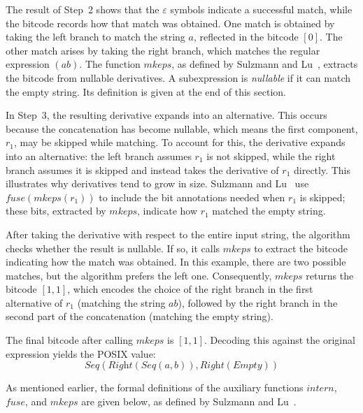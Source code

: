 \documentclass[12pt]{article}
\newcommand{\fuse}{\textit{fuse}}
\newcommand{\mkeps}{\textit{mkeps}}
\newcommand{\intern}{\textit{intern}}
\newcommand{\Seq}{\textit{Seq}}
\newcommand{\Right}{\textit{Right}}
\newcommand{\Empty}{\textit{Empty}}
\begin{document}
The result of Step~2 shows that the $\varepsilon$ symbols indicate a successful match,  
while the bitcode records how that match was obtained.  
One match is obtained by taking the left branch to match the string $a$, reflected in the bitcode $[0]$.  
The other match arises by taking the right branch, which matches the regular expression $(ab)$.  
The function $\mkeps$, as defined by Sulzmann and Lu~\cite{Sulzmann2014}, extracts the bitcode from nullable derivatives.  
A subexpression is \emph{nullable} if it can match the empty string.  
Its definition is given at the end of this section.  

In Step~3, the resulting derivative expands into an alternative.  
This occurs because the concatenation has become nullable, which means the first component, $r_1$, may be skipped while matching.  
To account for this, the derivative expands into an alternative: the left branch assumes $r_1$ is not skipped, 
while the right branch assumes it is skipped and instead takes the derivative of $r_1$ directly.  
This illustrates why derivatives tend to grow in size.  
Sulzmann and Lu~\cite{Sulzmann2014} use $\fuse(\mkeps(r_1))$ to include the bit annotations needed when $r_1$ is skipped; 
these bits, extracted by $\mkeps$, indicate how $r_1$ matched the empty string.  

After taking the derivative with respect to the entire input string, the algorithm checks whether the result is nullable.  
If so, it calls $\mkeps$ to extract the bitcode indicating how the match was obtained.  
In this example, there are two possible matches, but the algorithm prefers the left one.  
Consequently, $\mkeps$ returns the bitcode $[1,1]$, which encodes the choice of the right branch in the first alternative of $r_1$ 
(matching the string $ab$), followed by the right branch in the second part of the concatenation (matching the empty string).  

The final bitcode after calling $\mkeps$ is $[1,1]$.  
Decoding this against the original expression yields the POSIX value:
\[
\Seq(\Right(\Seq(a, b)), \Right(\Empty))
\]

As mentioned earlier, the formal definitions of the auxiliary functions $\intern$, $\fuse$, and $\mkeps$ are given below, 
as defined by Sulzmann and Lu~\cite{Sulzmann2014}.
\end{document}
